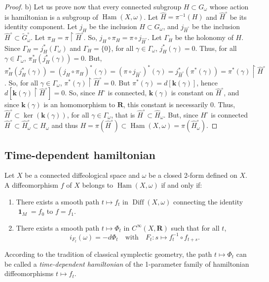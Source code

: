 \documentclass[10pt,reqno,twoside]{amsart}
\newcommand{\qmbox}[1]{\quad\mbox{#1}\quad}
\newcommand{\RR}{\mathbf{R}}
\DeclareMathOperator{\id}{\mathbf{1}}
\DeclareMathOperator{\Diff}{Diff}
\DeclareMathOperator{\Ham}{Ham}
\newcommand{\Cinfty}{C^\infty}
\newcommand{\tidGomega}{\widetilde{G}_\omega^\circ}
\newcommand{\ek}{\mathbf{k}}
\theoremstyle{plain}
\theoremstyle{definition}
\newcommand{\article}[1]{\subsection{#1}}
\begin{document}
\begin{proof}
    b) Let us prove now that every connected subgroup $H \subset G_\omega$ whose action is hamiltonian is a subgroup of $\Ham(X,\omega)$.
    Let $\widehat H = \pi^{-1}(H)$ and $\widehat H^\circ$ be its identity component.
    Let $j_H$ be the inclusion $H \subset G_\omega$,
    and $j_{\widehat H^\circ}$ be the inclusion $\widehat H^\circ \subset \tidGomega$.
    Let $\pi_{H} = \pi \restriction \widehat H^\circ$.
    So,
    $j_H \circ \pi_H = \pi \circ j_{\widehat H^\circ}$.
    Let $\Gamma_{H}$ be the holonomy of $H$.
    Since $\Gamma_{H} = j_{H}^*(\Gamma_\omega)$ and $\Gamma_H = \{0\}$,
    for all $\gamma \in \Gamma_\omega$,
    $j_H^*(\gamma) = 0$.
    Thus,
    for all $\gamma \in \Gamma_\omega$,
    $\pi_H^*(j_H^*(\gamma)) = 0$.
    But,
    $ \pi_H^*(j_H^*(\gamma)) = (j_H \circ \pi_H)^*(\gamma) = (\pi \circ j_{\widehat H^\circ})^*(\gamma) = j_{\widehat H^\circ}^*(\pi^*(\gamma)) = \pi^*(\gamma) \restriction \widehat H^\circ$.
    So,
    for all $\gamma \in \Gamma_\omega$,
    $\pi^*(\gamma) \restriction \widehat H^\circ = 0$.
    But $\pi^*(\gamma) = d[\ek(\gamma)]$,
    hence $d[\ek(\gamma) \restriction \widehat H^\circ] = 0$.
    So,
    since $H^\circ$ is connected,
    $\ek(\gamma)$ is constant on $\widehat H^\circ$,
    and since $\ek(\gamma)$ is an homomorphism to $\RR$,
    this constant is necessarily $0$.
    Thus,
    $\widehat H^\circ \subset \ker(\ek(\gamma))$,
    for all $\gamma \in \Gamma_\omega$,
    that is $\widehat H^\circ \subset \widehat H_\omega$.
    But,
    since $H^\circ$ is connected $\widehat H^\circ \subset \widehat H_\omega^\circ \subset H_\omega$ and thus $H = \pi(\widehat H^\circ) \subset \Ham(X,\omega) = \pi(\widehat H_\omega^\circ)$.
  \end{proof}
  
  \article{Time-dependent hamiltonian}
  \label{Time-dependent-hamiltonian}
  Let $X$ be a connected diffeological space and $\omega$ be a closed 2-form defined on $X$.
  A diffeomorphism $f$ of $X$ belongs to $\Ham(X,\omega)$ if and only if:
  \begin{enumerate}
    \item There exists a smooth path $t \mapsto f_t$ in $\Diff(X,\omega)$ connecting the identity $\id_M = f_0$ to $f = f_1$.
    \item There exists a smooth path $t \mapsto \Phi_t$ in $\Cinfty(X,\RR)$ such that for all $t$,
    $$
      i_{F_t}(\omega) = - d\Phi_t \qmbox{with} F_t : s \mapsto f_t^{-1} \circ f_{t+s}.
      $$
  \end{enumerate}
  According to the tradition of classical symplectic geometry,
  the path $t \mapsto \Phi_t$ can be called a {\em time-dependent hamiltonian} of the 1-parameter family of hamiltonian diffeomorphisms $t \mapsto f_t$.
  
\end{document}

